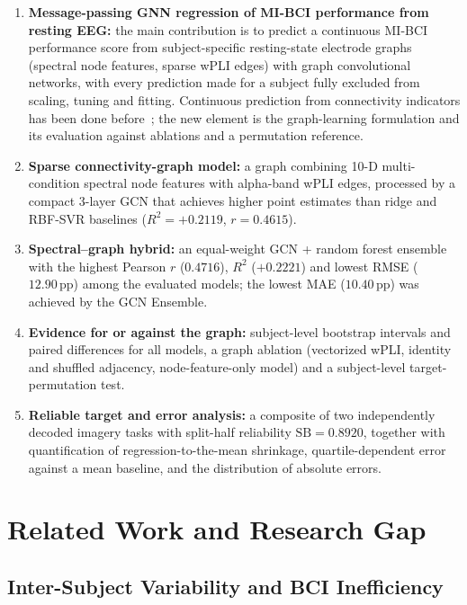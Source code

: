 \documentclass{ieeeaccess}
\newcommand{\pp}{\,\text{pp}}
\begin{document}
\begin{enumerate}[leftmargin=*]
    \item \textbf{Message-passing GNN regression of MI-BCI performance from resting EEG:} the main contribution is to predict a continuous MI-BCI performance score from subject-specific resting-state electrode graphs (spectral node features, sparse wPLI edges) with graph convolutional networks, with every prediction made for a subject fully excluded from scaling, tuning and fitting. Continuous prediction from connectivity indicators has been done before~\cite{caicedo2021}; the new element is the graph-learning formulation and its evaluation against ablations and a permutation reference.
    \item \textbf{Sparse connectivity-graph model:} a graph combining 10-D multi-condition spectral node features with alpha-band wPLI edges, processed by a compact 3-layer GCN that achieves higher point estimates than ridge and RBF-SVR baselines ($R^2=+0.2119$, $r=0.4615$).
    \item \textbf{Spectral--graph hybrid:} an equal-weight GCN + random forest ensemble with the highest Pearson $r$ ($0.4716$), $R^2$ ($+0.2221$) and lowest RMSE ($12.90\pp$) among the evaluated models; the lowest MAE ($10.40\pp$) was achieved by the GCN Ensemble.
    \item \textbf{Evidence for or against the graph:} subject-level bootstrap intervals and paired differences for all models, a graph ablation (vectorized wPLI, identity and shuffled adjacency, node-feature-only model) and a subject-level target-permutation test.
    \item \textbf{Reliable target and error analysis:} a composite of two independently decoded imagery tasks with split-half reliability $\mathrm{SB}=0.8920$, together with quantification of regression-to-the-mean shrinkage, quartile-dependent error against a mean baseline, and the distribution of absolute errors.
\end{enumerate}

\section{Related Work and Research Gap}

\subsection{Inter-Subject Variability and BCI Inefficiency}
\end{document}
